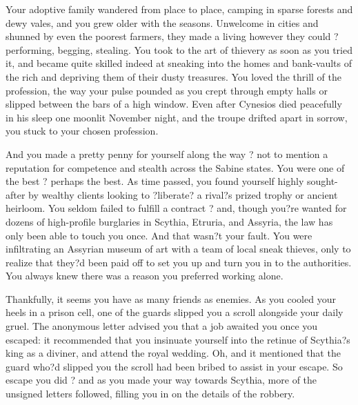 \documentclass[char]{Kos}
\begin{document}
    Your adoptive family wandered from place to place, camping in sparse forests and dewy vales, and you grew older with the seasons. Unwelcome in cities and shunned by even the poorest farmers, they made a living however they could ? performing, begging, stealing. You took to the art of thievery as soon as you tried it, and became quite skilled indeed at sneaking into the homes and bank-vaults of the rich and depriving them of their dusty treasures. You loved the thrill of the profession, the way your pulse pounded as you crept through empty halls or slipped between the bars of a high window. Even after Cynesios died peacefully in his sleep one moonlit November night, and the troupe drifted apart in sorrow, you stuck to your chosen profession. 

    And you made a pretty penny for yourself along the way ? not to mention a reputation for competence and stealth across the Sabine states. You were one of the best ? perhaps the best. As time passed, you found yourself highly sought-after by wealthy clients looking to ?liberate? a rival?s prized trophy or ancient heirloom. You seldom failed to fulfill a contract ? and, though you?re wanted for dozens of high-profile burglaries in Scythia, Etruria, and Assyria, the law has only been able to touch you once. And that wasn?t your fault. You were infiltrating an Assyrian museum of art with a team of local sneak thieves, only to realize that they?d been paid off to set you up and turn you in to the authorities. You always knew there was a reason you preferred working alone.

    Thankfully, it seems you have as many friends as enemies. As you cooled your heels in a prison cell, one of the guards slipped you a scroll alongside your daily gruel. The anonymous letter advised you that a job awaited you once you escaped: it recommended that you insinuate yourself into the retinue of Scythia?s king as a diviner, and attend the royal wedding. Oh, and it mentioned that the guard who?d slipped you the scroll had been bribed to assist in your escape. So escape you did ? and as you made your way towards Scythia, more of the unsigned letters followed, filling you in on the details of the robbery. 
\end{document}
